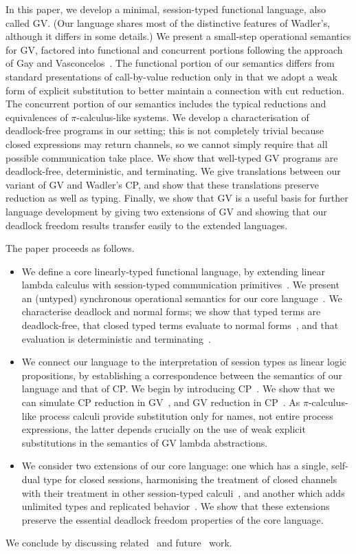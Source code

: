\documentclass[oribibl,orivec,envcountsame]{llncs}
\begin{document}
In this paper, we develop a minimal, session-typed functional language, also called GV.  (Our
language shares most of the distinctive features of Wadler's, although it differs in some details.)
We present a small-step operational semantics for GV, factored into functional and concurrent
portions following the approach of Gay and Vasconcelos~\cite{GayVasconcelos10}. The functional
portion of our semantics differs from standard presentations of call-by-value reduction only in that
we adopt a weak form of explicit substitution to better maintain a connection with cut
reduction. The concurrent portion of our semantics includes the typical reductions and equivalences
of $\pi$-calculus-like systems. We develop a characterisation of deadlock-free programs in our
setting; this is not completely trivial because closed expressions may return channels, so we cannot
simply require that all possible communication take place. We show that well-typed GV programs are
deadlock-free, deterministic, and terminating. We give translations between our variant of GV and
Wadler's CP, and show that these translations preserve reduction as well as typing. Finally, we show
that GV is a useful basis for further language development by giving two extensions of GV and
showing that our deadlock freedom results transfer easily to the extended languages.

The paper proceeds as follows.
\begin{itemize}
\item We define a core linearly-typed functional language, by extending linear lambda calculus with
  session-typed communication primitives~. We present an (untyped) synchronous
  operational semantics for our core language~. We characterise deadlock and normal
  forms; we show that typed terms are deadlock-free, that closed typed terms evaluate to normal
  forms~, and that evaluation is deterministic and
  terminating~.
\item We connect our language to the interpretation of session types as linear logic propositions,
  by establishing a correspondence between the semantics of our language and that of CP. We begin by
  introducing CP~. We show that we can simulate CP reduction in GV~, and GV
  reduction in CP~. As $\pi$-calculus-like process calculi provide substitution only
  for names, not entire process expressions, the latter depends crucially on the use of weak
  explicit substitutions in the semantics of GV lambda abstractions.
\item We consider two extensions of our core language: one which has a single, self-dual type for
  closed sessions, harmonising the treatment of closed channels with their treatment in other
  session-typed calculi~, and another which adds unlimited types and replicated
  behavior~. We show that these extensions preserve the essential deadlock freedom
  properties of the core language.
\end{itemize}
We conclude by discussing related~ and future~ work.
\end{document}
